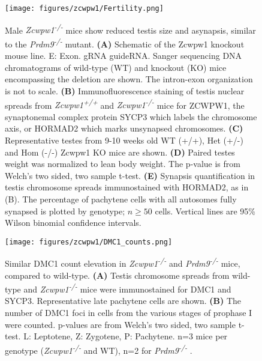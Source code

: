 \begin{figure}[H]
	\centering
	\texttt{[image: figures/zcwpw1/Fertility.png]}
	\caption[Zcwpw1 KO Phenotypes]{
		Male \textit{Zcwpw1\textsuperscript{-/-}} mice show reduced testis size and asynapsis, similar to the \textit{Prdm9\textsuperscript{-/-}} mutant.
		\textbf{(A)} Schematic of the Zcwpw1 knockout mouse line.
			E: Exon. gRNA guideRNA.
			Sanger sequencing DNA chromatograms of wild-type (WT) and knockout (KO) mice encompassing the deletion are shown.
			The intron-exon organization is not to scale.
		\textbf{(B)} Immunofluorescence staining of testis nuclear spreads from \textit{Zcwpw1\textsuperscript{+/+}} and \textit{Zcwpw1\textsuperscript{-/-}} mice for ZCWPW1, the synaptonemal complex protein SYCP3 which labels the chromosome axis, or HORMAD2 which marks unsynapsed chromosomes.
		\textbf{(C)} Representative testes from 9-10 weeks old WT (+/+), Het (+/-) and Hom (-/-) Zcwpw1 KO mice are shown.
		\textbf{(D)} Paired testes weight was normalized to lean body weight.
			The p-value is from Welch’s two sided, two sample t-test. \iffalse supp table 3 \fi
		\textbf{(E)} Synapsis quantification in testis chromosome spreads immunostained with HORMAD2, as in (B).
			The percentage of pachytene cells with all autosomes fully synapsed is plotted by genotype; $n\ge50$ cells.
			Vertical lines are 95\% Wilson binomial confidence intervals. \iffalse raw data table 4 \fi
	}
	\label{fig:Fertility}
\end{figure}

\begin{figure}[H]
	\centering
	\texttt{[image: figures/zcwpw1/DMC1\_counts.png]}
	\caption[DMC1 Counts]{
		Similar DMC1 count elevation in \textit{Zcwpw1\textsuperscript{-/-}} and \textit{Prdm9\textsuperscript{-/-}} mice, compared to wild-type.
		\textbf{(A)} Testis chromosome spreads from wild-type and \textit{Zcwpw1\textsuperscript{-/-}} mice were immunostained for DMC1 and SYCP3.
			Representative late pachytene cells are shown.
		\textbf{(B)} The number of DMC1 foci in cells from the various stages of prophase I were counted.
			p-values are from Welch’s two sided, two sample t-test.
			L: Leptotene, Z: Zygotene, P: Pachytene.
			n=3 mice per genotype (\textit{Zcwpw1\textsuperscript{-/-}} and WT), n=2 for \textit{Prdm9\textsuperscript{-/-}} \iffalse raw data \fi.
	}
	\label{fig:DMC1_count}
\end{figure}

